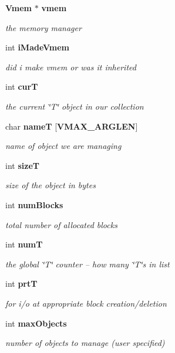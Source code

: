 \begin{DoxyCompactItemize}
\item 
{\bf Vmem} $\ast$ {\bf vmem}
\begin{DoxyCompactList}\small\item\em the memory manager \end{DoxyCompactList}\item 
int {\bf i\+Made\+Vmem}
\begin{DoxyCompactList}\small\item\em did i make vmem or was it inherited \end{DoxyCompactList}\item 
int {\bf cur\+T}
\begin{DoxyCompactList}\small\item\em the current \char`\"{}\+T\char`\"{} object in our collection \end{DoxyCompactList}\item 
char {\bf name\+T} [{\bf V\+M\+A\+X\+\_\+\+A\+R\+G\+L\+E\+N}]
\begin{DoxyCompactList}\small\item\em name of object we are managing \end{DoxyCompactList}\item 
int {\bf size\+T}
\begin{DoxyCompactList}\small\item\em size of the object in bytes \end{DoxyCompactList}\item 
int {\bf num\+Blocks}
\begin{DoxyCompactList}\small\item\em total number of allocated blocks \end{DoxyCompactList}\item 
int {\bf num\+T}
\begin{DoxyCompactList}\small\item\em the global \char`\"{}\+T\char`\"{} counter -- how many \char`\"{}\+T\char`\"{}s in list \end{DoxyCompactList}\item 
int {\bf prt\+T}
\begin{DoxyCompactList}\small\item\em for i/o at appropriate block creation/deletion \end{DoxyCompactList}\item 
int {\bf max\+Objects}
\begin{DoxyCompactList}\small\item\em number of objects to manage (user specified) \end{DoxyCompactList}\item 

\end{DoxyCompactItemize}
